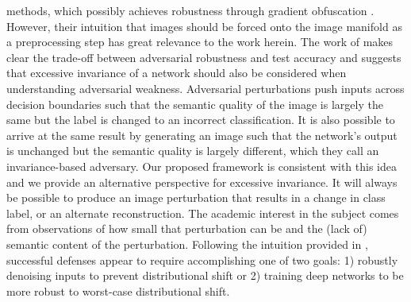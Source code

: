 methods, which possibly achieves robustness through gradient obfuscation \parencite{athalye2018obfuscated}. However, their intuition that images should be forced onto the image manifold as a preprocessing step has great relevance to the work herein. The work of \cite{jacobsen2018excessive} makes clear the trade-off between adversarial robustness and test accuracy and suggests that excessive invariance of a network should also be considered when understanding adversarial weakness. Adversarial perturbations push inputs across decision boundaries such that the semantic quality of the image is largely the same but the label is changed to an incorrect classification. It is also possible to arrive at the same result by generating an image such that the network's output is unchanged but the semantic quality is largely different, which they call an invariance-based adversary. Our proposed framework is consistent with this idea and we provide an alternative perspective for excessive invariance. It will always be possible to produce an image perturbation that results in a change in class label, or an alternate reconstruction. The academic interest in the subject comes from observations of how small that perturbation can be and the (lack of) semantic content of the perturbation. Following the intuition provided in \parencite{ford2019adversarial}, successful defenses appear to require accomplishing one of two goals: 1) robustly denoising inputs to prevent distributional shift or 2) training deep networks to be more robust to worst-case distributional shift.



